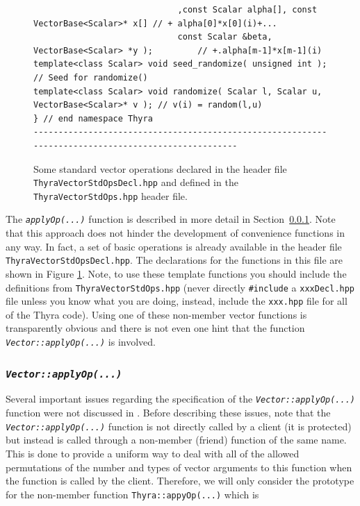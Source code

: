 \documentclass[pdf,ps2pdf,11pt]{SANDreport}
\begin{document}
{\begin{figure}[p]
\begin{minipage}{\textwidth}
{\begin{verbatim}
                             ,const Scalar alpha[], const VectorBase<Scalar>* x[] // + alpha[0]*x[0](i)+...
                             const Scalar &beta, VectorBase<Scalar> *y );         // +.alpha[m-1]*x[m-1](i)
template<class Scalar> void seed_randomize( unsigned int );                   // Seed for randomize()
template<class Scalar> void randomize( Scalar l, Scalar u, VectorBase<Scalar>* v ); // v(i) = random(l,u)
} // end namespace Thyra
----------------------------------------------------------------------------------------------------
\end{verbatim}}
\end{minipage}
\caption{
\label{tsfcore:fig:std_vec_ops}
Some standard vector operations declared in the header file
{}\texttt{Thyra\-Vector\-Std\-Ops\-Decl.hpp} and defined in the
{}\texttt{Thyra\-Vector\-Std\-Ops.hpp} header file. 
}
\end{figure}
\esinglespace}

The {}\texttt{\textit{applyOp(\-...)}}  function is described in more detail
in Section~\ref{tsfcore:sec:vec_apply_op}.  Note that this approach does not
hinder the development of convenience functions in any way.  In fact, a set of
basic operations is already available in the header file
{}\texttt{Thyra\-Vector\-Std\-Ops\-Decl.hpp}.  The declarations for the
functions in this file are shown in Figure {}\ref{tsfcore:fig:std_vec_ops}.
Note, to use these template functions you should include the definitions from
{}\texttt{Thyra\-Vector\-Std\-Ops.hpp} (never directly {}\texttt{\#include} a
{}\texttt{xxxDecl.hpp} file unless you know what you are doing, instead,
include the {}\texttt{xxx.hpp} file for all of the Thyra code).  Using one of
these non-member vector functions is transparently obvious and there is not
even one hint that the function {}\texttt{\textit{Vector::applyOp(\-...)}} is
involved.

%
\subsubsection{\texttt{\textit{Vector::applyOp(\-...)}}}
\label{tsfcore:sec:vec_apply_op}
%

Several important issues regarding the specification of the
{}\texttt{\textit{Vector::applyOp(\-...)}} function were not discussed
in {}\cite{ref:rtop_toms}.  Before describing these issues, note that
the {}\texttt{\textit{Vector\-::applyOp(\-...)}} function is not
directly called by a client (it is protected) but instead is called
through a non-member (friend) function of the same name.  This is done
to provide a uniform way to deal with all of the allowed permutations
of the number and types of vector arguments to this function when the
function is called by the client.  Therefore, we will only consider
the prototype for the non-member function
{}\texttt{Thyra::appyOp(...)}  which is
\end{document}
